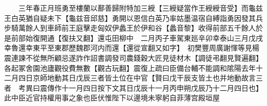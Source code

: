　　三年春正月班勇至樓蘭以鄯善歸附特加三綬【三綬疑當作王綬綬音受】而龜兹王白英猶自疑未下【龜兹音邱慈】勇開以恩信白英乃率姑墨温宿自縛詣勇因發其兵步騎萬餘人到車師前王庭擊走匈奴伊蠡王於伊和谷【蠡音黎】收得前部五千餘人於是前部始復開通【復扶又翻】還屯田柳中　二月丙子車駕東廵辛卯幸泰山三月戊戌幸魯還幸東平至東郡歷魏郡河内而還【還從宣翻又如字】　初樊豐周廣謝惲等見楊震連諫不從無所顧忌遂詐作詔書調發司農錢穀大匠見徒材木【調徒弔翻見賢遍翻】各起冢舍園池廬觀役費無數【觀古玩翻】震復上疏曰臣備台輔不能調和隂陽去年十二月四日京師地動其日戊辰三者皆土位在中官【賢曰戊干辰支皆土也并地動故言三者　考異曰震傳作十一月四日按下文其日戊辰十一月丙申朔戊辰乃十二月四日也】此中臣近官持權用事之象也臣伏惟陛下以邊境未寧躬自菲薄宫殿垣屋